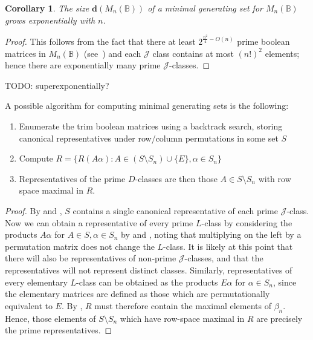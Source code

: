 \documentclass[11pt]{article}
\newtheorem{cor}[thm]{Corollary}
\numberwithin{equation}{section}
\newcommand{\set}[2]{\ensuremath{\{#1 : #2 \}}}
\newcommand{\B}{\mathbb{B}}
\newcommand{\Bn}{M_n(\B)}
\newcommand{\J}{\mathscr{J}}
\begin{document}
\begin{cor}
  The size $\mathbf{d}(\Bn)$ of a minimal generating set for $\Bn$ grows
  exponentially with $n$.
\end{cor}
\begin{proof}
  This follows from the fact that there at least $2^{\frac{n^2}{4} - O(n)}$
  prime boolean matrices in $\Bn$ (see~\cite[Theorem 2.4.1]{Kim1982aa}) and each
  $\J$ class contains at most $(n!)^2$ elements; hence there are exponentially
  many prime $\J$-classes.
\end{proof}
TODO: superexponentially?

A possible algorithm for computing minimal generating sets is the following:

\begin{enumerate}
  \item
    Enumerate the trim boolean matrices using a backtrack search, storing 
    canonical representatives under row/column permutations in some set $S$
  \item 
    Compute $R = \set{R(A\alpha)}{A \in (S\setminus S_n) \cup \{E\}, \alpha \in S_n}$
  \item 
    Representatives of the prime $D$-classes are then those $A \in S\setminus S_n$ 
    with row space maximal in $R$.
\end{enumerate}

\begin{proof}
  By  and ,
  $S$ contains a single canonical representative of each prime $\J$-class.  Now
  we can obtain a representative of every prime $L$-class by considering the
  products $A\alpha$ for $A \in S, \alpha \in S_n$ by
   and ,
  noting that multiplying on the left by a permutation matrix does not change
  the $L$-class. It is likely at this point that there will also be
  representatives of non-prime $\J$-classes, and that the representatives will
  not represent distinct classes. 
  Similarly, representatives of every elementary $L$-class can be obtained as the
  products $E\alpha$ for $\alpha \in S_n$, since the elementary matrices are
  defined as those which are permutationally equivalent to $E$.
  By , $R$ must therefore contain the maximal
  elements of $\beta_n$. Hence, those elements of $S \setminus S_n$ which have
  row-space maximal in $R$ are precisely the prime representatives. 
\end{proof}
\end{document}
